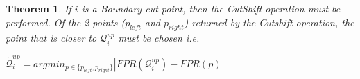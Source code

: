 \documentclass{article}
\newtheorem{theorem}{Theorem}[section]
\newcommand{\sd}[1]{ \textcolor{orange}{{\bf SD: }{``\em #1''}}}
\begin{document}




\begin{theorem}
If $i$ is a Boundary cut point, then the CutShift operation must be performed. Of the 2 points ($p_{left}$ and $p_{right}$) returned by the Cutshift operation, the point that is closer to $\mathcal{Q}_{i}^{up}$ must be chosen i.e.
    
    $\mathcal{\widetilde{Q}}_i^{up} = argmin_{p \in \{ p_{left} , p_{right}\}} |FPR(\mathcal{Q}_i^{up}) - FPR(p)|$
\end{theorem}
\end{document}
